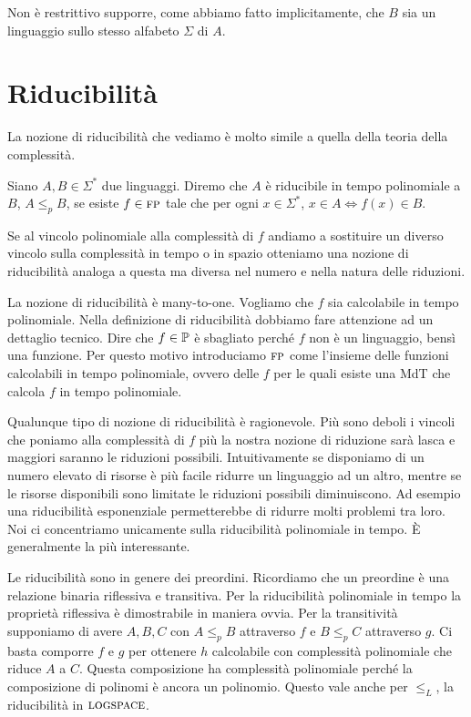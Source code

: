 Non è restrittivo supporre, come abbiamo fatto implicitamente, che $B$ sia un linguaggio sullo
stesso alfabeto $\Sigma$ di $A$.

\section{Riducibilità}


La nozione di riducibilità che vediamo è molto simile a quella della teoria della complessità.

\begin{defn}
    Siano $A,B \in \Sigma^{*}$ due linguaggi. Diremo che $A$ è riducibile in tempo polinomiale a
    $B$, $A \leq_{p} B$, se esiste $f \in \textsc{fp}$ tale che per ogni $x \in \Sigma^{*}$, $x \in A \iff
    f(x) \in B$.
\end{defn}
Se al vincolo polinomiale alla complessità di $f$ andiamo a sostituire un diverso vincolo sulla
complessità in tempo o in spazio otteniamo una nozione di riducibilità analoga a questa ma diversa
nel numero e nella natura delle riduzioni.

La nozione di riducibilità è many-to-one. Vogliamo che $f$ sia calcolabile in tempo polinomiale.
Nella definizione di riducibilità dobbiamo fare attenzione ad un dettaglio tecnico.  Dire che $f
\in \mathbb{P}$ è sbagliato perché $f$ non è un linguaggio, bensì una funzione. Per questo motivo
introduciamo $\textsc{fp}$ come l'insieme delle funzioni calcolabili in tempo polinomiale, ovvero delle $f$
per le quali esiste una MdT che calcola $f$ in tempo polinomiale.

Qualunque tipo di nozione di riducibilità è ragionevole. Più sono deboli i vincoli che poniamo
alla complessità di $f$ più la nostra nozione di riduzione sarà lasca e maggiori saranno le
riduzioni possibili. Intuitivamente se disponiamo di un numero elevato di risorse è più facile
ridurre un linguaggio ad un altro, mentre se le risorse disponibili sono limitate le riduzioni
possibili diminuiscono. Ad esempio una riducibilità esponenziale permetterebbe di ridurre molti
problemi tra loro. Noi ci concentriamo unicamente sulla riducibilità polinomiale in tempo. È
generalmente la più interessante.

Le riducibilità sono in genere dei preordini. Ricordiamo che un preordine è una relazione binaria
riflessiva e transitiva. Per la riducibilità polinomiale in tempo la proprietà riflessiva è
dimostrabile in maniera ovvia. Per la transitività supponiamo di avere $A,B,C$ con $A \leq_{p} B$
attraverso $f$ e $B \leq_{p} C$ attraverso $g$. Ci basta comporre $f$ e $g$ per ottenere $h$
calcolabile con complessità polinomiale che riduce $A$ a $C$. Questa composizione ha complessità
polinomiale perché la composizione di polinomi è ancora un polinomio. Questo vale anche per
$\leq_{L}$, la riducibilità in $\textsc{logspace}$.

